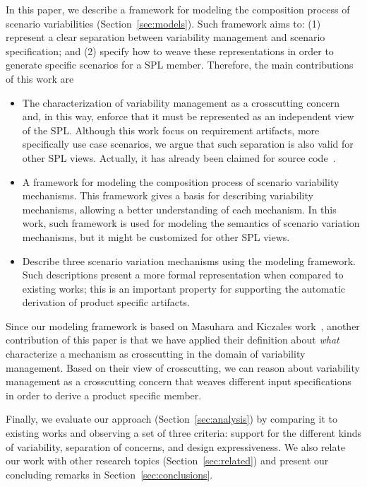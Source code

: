 \documentclass{acm_proc_article-sp}
\begin{document}
In this paper, we describe a framework for modeling the composition 
process of scenario variabilities (Section~\ref{sec:models}). 
Such framework aims to: (1) represent a clear separation between variability management 
and scenario specification; and (2) specify how to weave these representations in order to generate
specific scenarios for a SPL member. Therefore, the main contributions of this work are

\begin{itemize}

\item The characterization of variability management as a crosscutting concern and, in this way, enforce that it  
must be represented as an independent view of the SPL. Although this work focus on requirement artifacts, 
more specifically use case scenarios, we argue that such separation is also valid for other SPL views. Actually,
it has already been claimed for source code~\cite{alves-gpce-06,mmedeiros-lawasp-2007}.
  
\item A framework for modeling the composition process of scenario variability mechanisms. 
This framework gives a basis for describing variability mechanisms, 
allowing a better understanding of each mechanism. In this work, such framework is used for modeling 
the semantics of scenario variation mechanisms, but it might be customized for other SPL views.

\item Describe three scenario variation mechanisms using the
modeling framework. Such descriptions present
a more formal representation when compared to existing works; this is an
important property for supporting the automatic derivation of product
specific artifacts.

\end{itemize}

Since our modeling framework is based on Masuhara and Kiczales work~\cite{kiczales-ecoop-2003}, another 
contribution of this paper is that we have applied their definition about \emph{what} characterize a mechanism as crosscutting in the domain of variability management. Based on their view of crosscutting, we can reason about variability management as a crosscutting concern that weaves different input specifications in order to derive a product specific member. 

Finally, we evaluate our approach (Section~\ref{sec:analysis}) by comparing it 
to existing works and observing a set of three criteria: support for the 
different kinds of variability, separation of concerns, and design expressiveness.  We 
also relate our work with other research topics (Section~\ref{sec:related}) and present our concluding 
remarks in Section~\ref{sec:conclusions}.
\end{document}
